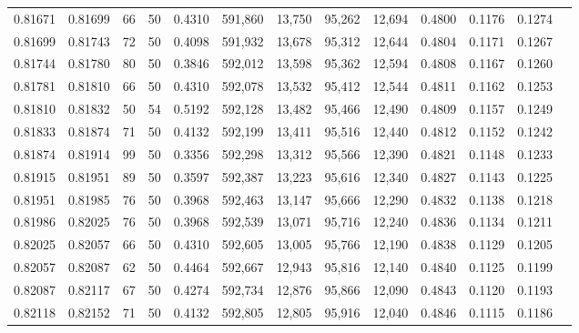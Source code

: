 \begin{tabular}{rrrrrrrrrrrrr}
0.81671 & 0.81699 &    66 &  50 &                                     0.4310 & 591,860 &  13,750 &  95,262 &  12,694 & 0.4800 & 0.1176 & 0.1274 \\
0.81699 & 0.81743 &    72 &  50 &                                     0.4098 & 591,932 &  13,678 &  95,312 &  12,644 & 0.4804 & 0.1171 & 0.1267 \\
0.81744 & 0.81780 &    80 &  50 &                                     0.3846 & 592,012 &  13,598 &  95,362 &  12,594 & 0.4808 & 0.1167 & 0.1260 \\
0.81781 & 0.81810 &    66 &  50 &                                     0.4310 & 592,078 &  13,532 &  95,412 &  12,544 & 0.4811 & 0.1162 & 0.1253 \\
0.81810 & 0.81832 &    50 &  54 &                                     0.5192 & 592,128 &  13,482 &  95,466 &  12,490 & 0.4809 & 0.1157 & 0.1249 \\
0.81833 & 0.81874 &    71 &  50 &                                     0.4132 & 592,199 &  13,411 &  95,516 &  12,440 & 0.4812 & 0.1152 & 0.1242 \\
0.81874 & 0.81914 &    99 &  50 &                                     0.3356 & 592,298 &  13,312 &  95,566 &  12,390 & 0.4821 & 0.1148 & 0.1233 \\
0.81915 & 0.81951 &    89 &  50 &                                     0.3597 & 592,387 &  13,223 &  95,616 &  12,340 & 0.4827 & 0.1143 & 0.1225 \\
0.81951 & 0.81985 &    76 &  50 &                                     0.3968 & 592,463 &  13,147 &  95,666 &  12,290 & 0.4832 & 0.1138 & 0.1218 \\
0.81986 & 0.82025 &    76 &  50 &                                     0.3968 & 592,539 &  13,071 &  95,716 &  12,240 & 0.4836 & 0.1134 & 0.1211 \\
0.82025 & 0.82057 &    66 &  50 &                                     0.4310 & 592,605 &  13,005 &  95,766 &  12,190 & 0.4838 & 0.1129 & 0.1205 \\
0.82057 & 0.82087 &    62 &  50 &                                     0.4464 & 592,667 &  12,943 &  95,816 &  12,140 & 0.4840 & 0.1125 & 0.1199 \\
0.82087 & 0.82117 &    67 &  50 &                                     0.4274 & 592,734 &  12,876 &  95,866 &  12,090 & 0.4843 & 0.1120 & 0.1193 \\
0.82118 & 0.82152 &    71 &  50 &                                     0.4132 & 592,805 &  12,805 &  95,916 &  12,040 & 0.4846 & 0.1115 & 0.1186 \\

\end{tabular}
